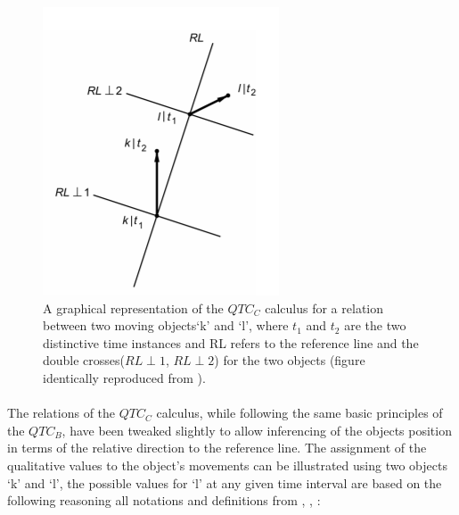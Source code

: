 	\newpage
	
	\begin{figure}[h!]
		\centering
		\includegraphics[scale=1]{images/QTCC}
		\caption{A graphical representation of the $QTC_C$ calculus for a relation between two moving objects`k' and `l', where $t_1$ and $t_2$ are the two distinctive time instances and RL refers to the reference line and the double crosses($RL\perp1$, $RL\perp2$) for the two objects (figure identically reproduced from \cite{van2005qualitative}).}
		\label{fig:qtcc}
	\end{figure}

	\paragraph{}The relations of the $QTC_C$ calculus, while following the same basic principles of the $QTC_B$, have been tweaked slightly to allow inferencing of the objects position in terms of the relative direction to the reference line. The assignment of the qualitative values to the object's movements can be illustrated using two objects `k' and `l', the possible values for `l' at any given time interval are based on the following reasoning all notations and definitions from \cite{van2004representing}, \cite{van2006qualitative}, \cite{van2005qualitative}:
	
